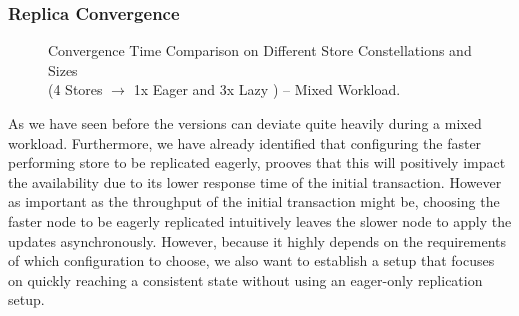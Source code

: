 \subsubsection{Replica Convergence} 



\begin{figure}[t] 
    \centering 
    \caption{Convergence Time Comparison on Different Store Constellations and Sizes\\(4 Stores $\rightarrow$ 1x Eager and 3x Lazy ) -- Mixed Workload.}
    \label{fig:store_comparision}
\end{figure}

As we have seen before the versions can deviate quite heavily during a mixed workload. 
Furthermore, we have already identified that configuring the faster performing store to be replicated eagerly, prooves that this will positively impact 
the availability due to its lower response time of the initial transaction.
However as important as the throughput of the initial transaction might be, choosing the faster node to be eagerly replicated intuitively leaves the slower node
to apply the updates asynchronously. 
However, because it highly depends on the requirements of which configuration to choose, we also want to establish a setup that focuses on quickly reaching
a consistent state without using an eager-only replication setup.



